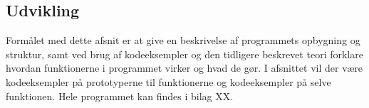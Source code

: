 \subsection{Udvikling}
Formålet med dette afsnit er at give en beskrivelse af programmets opbygning og struktur, samt ved brug af kodeeksempler og den tidligere beskrevet teori forklare hvordan funktionerne i programmet virker og hvad de gør. I afsnittet vil der være kodeeksempler på prototyperne til funktionerne og kodeeksempler på selve funktionen. Hele programmet kan findes i bilag XX.



















